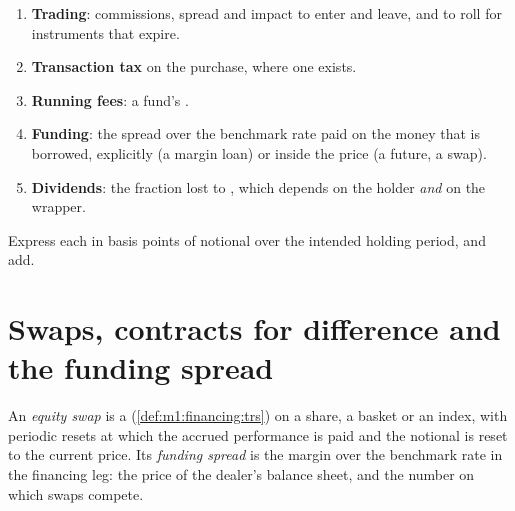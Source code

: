 \begin{method}\label{met:m1:delta-one-instruments:five}
\begin{enumerate}
\item \textbf{Trading}: commissions, spread and impact to enter and leave,
and to roll for instruments that expire.
\item \textbf{Transaction tax} on the purchase, where one exists.
\item \textbf{Running fees}: a fund's .
\item \textbf{Funding}: the spread over the benchmark rate paid on the money
that is borrowed, explicitly (a margin loan) or inside the price (a future,
a swap).
\item \textbf{Dividends}: the fraction lost to , which depends
on the holder \emph{and} on the wrapper.
\end{enumerate}
Express each in basis points of notional over the intended holding period,
and add.
\end{method}

\section{Swaps, contracts for difference and the funding spread}

\begin{definition}\label{def:m1:delta-one-instruments:swap}
An \emph{equity swap} is a 
(\cref{def:m1:financing:trs}) on a share, a basket or an index, with periodic
resets at which the accrued performance is paid and the notional is reset to
the current price. Its \emph{funding spread} is the
margin over the benchmark rate in the financing leg: the price of the
dealer's balance sheet, and the number on which swaps compete.
\end{definition}

